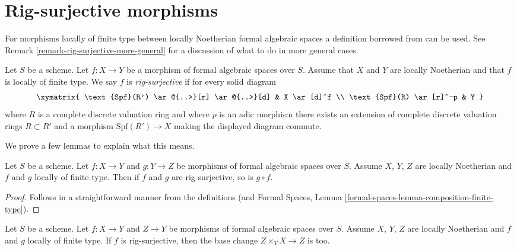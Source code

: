 \section{Rig-surjective morphisms}
\label{section-rig-surjective}

\noindent
For morphisms locally of finite type between locally Noetherian formal
algebraic spaces a definition borrowed from \cite{ArtinII} can be used. See
Remark \ref{remark-rig-surjective-more-general} for a discussion
of what to do in more general cases.

\begin{definition}
\label{definition-rig-surjective}
Let $S$ be a scheme. Let $f : X \to Y$ be a morphism of formal
algebraic spaces over $S$. Assume that $X$ and $Y$ are locally
Noetherian and that $f$ is locally of finite type. We say
$f$ is {\it rig-surjective} if for every solid diagram
$$
\xymatrix{
\text{Spf}(R') \ar@{..>}[r] \ar@{..>}[d] & X \ar[d]^f \\
\text{Spf}(R) \ar[r]^-p & Y
}
$$
where $R$ is a complete discrete valuation ring and where
$p$ is an adic morphism there exists an
extension of complete discrete valuation rings $R \subset R'$
and a morphism $\text{Spf}(R') \to X$ making the displayed diagram commute.
\end{definition}

\noindent
We prove a few lemmas to explain what this means.

\begin{lemma}
\label{lemma-composition-rig-surjective}
Let $S$ be a scheme. Let $f : X \to Y$ and $g : Y \to Z$ be morphisms of formal
algebraic spaces over $S$. Assume $X$, $Y$, $Z$ are locally Noetherian and
$f$ and $g$ locally of finite type. Then if $f$ and $g$ are rig-surjective,
so is $g \circ f$.
\end{lemma}

\begin{proof}
Follows in a straightforward manner from the definitions
(and Formal Spaces, Lemma \ref{formal-spaces-lemma-composition-finite-type}).
\end{proof}

\begin{lemma}
\label{lemma-base-change-rig-surjective}
Let $S$ be a scheme. Let $f : X \to Y$ and $Z \to Y$ be morphisms
of formal algebraic spaces over $S$. Assume $X$, $Y$, $Z$ are locally
Noetherian and $f$ and $g$ locally of finite type. If $f$ is
rig-surjective, then the base change $Z \times_Y X \to Z$ is too.
\end{lemma}

